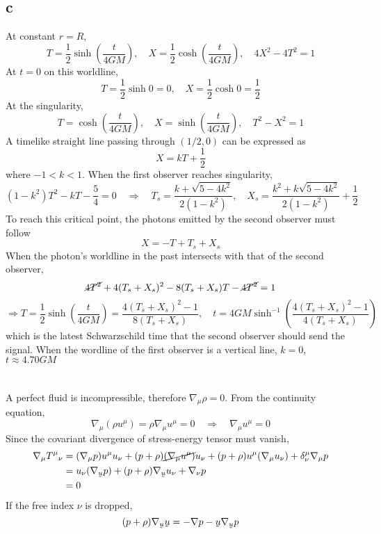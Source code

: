\documentclass{article}
\newcommand{\ut}[1]{\underaccent{\tilde}{#1}}
\begin{document}
\subsection*{c}
At constant $r = R$,
\[  T = \frac{1}{2}\sinh\left( \frac{t}{4GM} \right), \quad X = \frac{1}{2}\cosh\left( \frac{t}{4GM} \right)
	,\quad 4X^2 - 4T^2 = 1 \]
At $t = 0$ on this worldline,
\[ T = \frac{1}{2}\sinh0 = 0, \quad X = \frac{1}{2}\cosh0 = \frac{1}{2} \]
At the singularity,
\[ T = \cosh\left( \frac{t}{4GM} \right),\quad X = \sinh\left( \frac{t}{4GM} \right), \quad T^2 - X^2 = 1 \]
A timelike straight line passing through $(1/2, 0)$ can be expressed as 
\[ X = kT + \frac{1}{2}\]
where $-1 < k< 1$. When the first observer reaches singularity,
\[ (1- k^2)T^2 - kT - \frac{5}{4} = 0 \quad\Rightarrow\quad \boxed{T_s = \frac{k + \sqrt{5-4k^2}}{2(1-k^2)},\quad
	X_s = \frac{k^2 + k\sqrt{5-4k^2}}{2(1-k^2)} + \frac{1}{2}}\]
To reach this critical point, the photons emitted by the second observer must follow
\[ X  = - T + T_s + X_s \]
When the photon's worldline in the past intersects with that of the second observer,
\[ \cancel{4T^2} + 4(T_s + X_s)^2 -8(T_s+X_s)T - \cancel{4T^2} = 1\]
\[ \Rightarrow T = \frac{1}{2}\sinh\left( \frac{t}{4GM} \right)  = \frac{4(T_s+X_s)^2 - 1}{8(T_s + X_s)}
	,\quad \boxed{t = 4GM\sinh^{-1}\left(\frac{4(T_s+X_s)^2 - 1}{4(T_s + X_s)}\right)} \]
which is the latest Schwarzschild time that the second observer should send the signal. When the wordline of the first observer is a vertical line, $k=0$, $t \approx 4.70GM$
\section{}
A perfect fluid is incompressible, therefore $\nabla_\mu \rho = 0$. From the continuity equation,
\[ \nabla_\mu(\rho u^\mu) =  \rho \nabla_\mu u^\mu = 0 \quad\Rightarrow\quad \nabla_\mu u^\mu = 0\]
Since the covariant divergence of stress-energy tensor must vanish,
\begin{align*}
\nabla_\mu T^\mu{}_\nu &= (\nabla_\mu p) u^\mu u_\nu + (p+\rho) \cancel{(\nabla_\mu u^\mu)} u_\nu + (p+\rho) u^\mu (\nabla_\mu u_\nu) + \delta^\mu_\nu \nabla_\mu p \\
&=  u_\nu (\nabla_{\ut{u}} p)  + (p+\rho) \nabla_{\ut{u}} u_\nu + \nabla_\nu p \\
&= 0
\end{align*}
If the free index $\nu$ is dropped,
\[ (p + \rho)\nabla_{\ut{u}}\ut{u} = - \nabla p - \ut{u}\nabla_{\ut{u}}p \]
\end{document}
